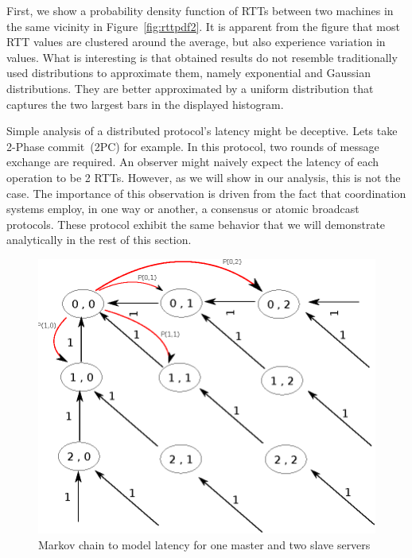 First, we show a probability density function of RTTs between two machines in the same vicinity in Figure~\ref{fig:rttpdf2}. It is apparent from the figure that most RTT values are clustered around the average, but also experience variation in values. What is interesting is that obtained results do not resemble traditionally used distributions to approximate them, namely exponential and Gaussian distributions. They are better approximated by a uniform distribution that captures the two largest bars in the displayed histogram.

Simple analysis of a distributed protocol's latency might be deceptive. Lets take 2-Phase commit~(2PC) for example. In this protocol, two rounds of message exchange are required. An observer might naively expect the latency of each operation to be 2 RTTs. However, as we will show in our analysis, this is not the case. The importance of this observation is driven from the fact that coordination systems employ, in one way or another, a consensus or atomic broadcast protocols. These protocol exhibit the same behavior that we will demonstrate analytically in the rest of this section.


\begin{figure}[h]
\centering
\includegraphics[scale=0.8]{img/markov_general.eps}
\caption{Markov chain to model latency for one master and two slave servers}
\label{fig:markovgeneral}
\end{figure}

